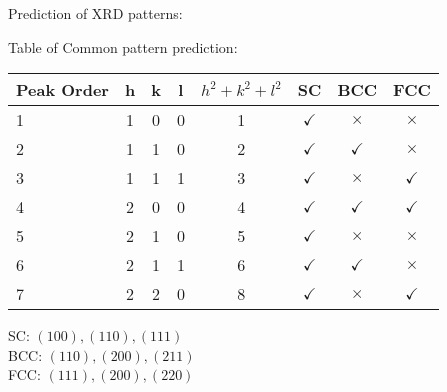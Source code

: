 \documentclass{article}
\begin{document}
\begin{multicols}{2}
Prediction of XRD patterns:

Table of Common pattern prediction:
\begin{center}
    \begin{tabular}{ l c c c c c c c }
        Peak Order & h & k & l & $h^2 + k^2 + l^2$ & SC & BCC & FCC \\
        \hline
        1 & 1 & 0 & 0 & 1 & $\checkmark$ & $\times$     & $\times$ \\
        2 & 1 & 1 & 0 & 2 & $\checkmark$ & $\checkmark$ & $\times$ \\
        3 & 1 & 1 & 1 & 3 & $\checkmark$ & $\times$     & $\checkmark$ \\
        4 & 2 & 0 & 0 & 4 & $\checkmark$ & $\checkmark$ & $\checkmark$ \\
        5 & 2 & 1 & 0 & 5 & $\checkmark$ & $\times$     & $\times$ \\
        6 & 2 & 1 & 1 & 6 & $\checkmark$ & $\checkmark$ & $\times$ \\
        7 & 2 & 2 & 0 & 8 & $\checkmark$ & $\times$     & $\checkmark$ \\
    \end{tabular}
\end{center}
SC:  $(100), (110), (111)$\\
BCC: $(110), (200), (211)$\\
FCC: $(111), (200), (220)$


\end{multicols}
\end{document}
